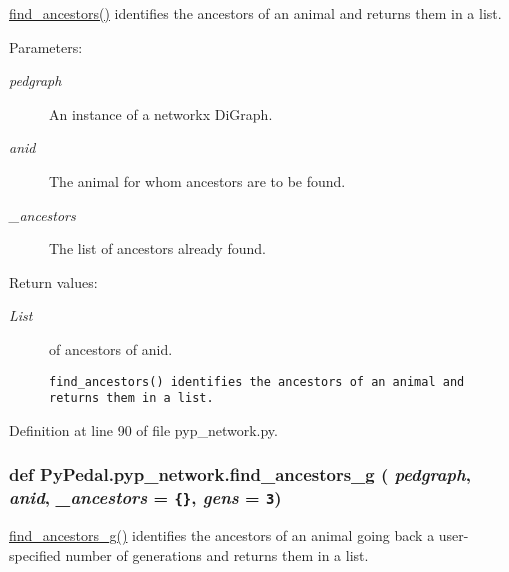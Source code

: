 \hyperlink{namespacePyPedal_1_1pyp__network_3e638a2ecefb9a7a010490534e8c5cd3}{find\_\-ancestors()} identifies the ancestors of an animal and returns them in a list. 

\begin{Desc}
\item[Parameters:]
\begin{description}
\item[{\em pedgraph}]An instance of a networkx Di\-Graph. \item[{\em anid}]The animal for whom ancestors are to be found. \item[{\em \_\-ancestors}]The list of ancestors already found. \end{description}
\end{Desc}
\begin{Desc}
\item[Return values:]
\begin{description}
\item[{\em List}]of ancestors of anid.

\footnotesize\begin{verbatim}find_ancestors() identifies the ancestors of an animal and returns them in a list.
\end{verbatim}
\normalsize
 \end{description}
\end{Desc}


Definition at line 90 of file pyp\_\-network.py.\hypertarget{namespacePyPedal_1_1pyp__network_e525dea748cda15e194c437134842016}{
\subsubsection[find\_\-ancestors\_\-g]{\setlength{\rightskip}{0pt plus 5cm}def Py\-Pedal.pyp\_\-network.find\_\-ancestors\_\-g ( {\em pedgraph},  {\em anid},  {\em \_\-ancestors} = {\tt \{\}},  {\em gens} = {\tt 3})}}
\label{namespacePyPedal_1_1pyp__network_e525dea748cda15e194c437134842016}


\hyperlink{namespacePyPedal_1_1pyp__network_e525dea748cda15e194c437134842016}{find\_\-ancestors\_\-g()} identifies the ancestors of an animal going back a user-specified number of generations and returns them in a list. 

